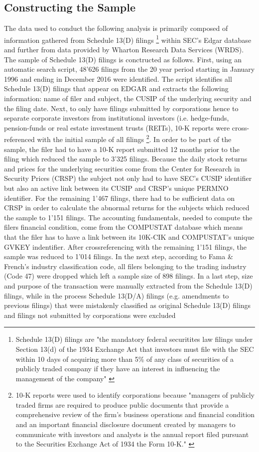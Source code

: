 \documentclass[12pt]{article}
\begin{document}
\subsection{Constructing the Sample}
The data used to conduct the following analysis is primarily composed of information gathered from Schedule 13(D) filings 
	\footnote{Schedule 13(D) filings are "the mandatory federal securitites law filings under Section 13(d) of the 1934 Exchange Act that investors must file with the SEC within 10 days of acquiring more than 5\% of any class of securities of a publicly traded company if they have an interest in influencing the management of the company" \citep[p. 1736]{Brav2008}} 
within SEC's Edgar database and further from data provided by Wharton Research Data Services (WRDS). The sample of Schedule 13(D) filings is conctructed as follows. First, using an automatic search script, 48'626 filings from the 20 year period starting in January 1996 and ending in December 2016 were identified.  The script identifies all Schedule 13(D) filings that appear on EDGAR and extracts the following information: name of filer and subject, the CUSIP of the underlying security and the filing date. Next, to only have filings submitted by corporations hence to separate corporate investors from institutional investors (i.e. hedge-funds, pension-funds or real estate investment trusts (REITs), 10-K reports were cross-referenced with the initial sample of all filings
	\footnote{10-K reports were used to identify corporations because "managers of publicly traded firms are required to produce public documents that provide a comprehensive review of the firm’s business operations and financial condition and an important financial disclosure document created by managers to communicate with investors and analysts is the annual report filed pursuant to the Securities Exchange Act of 1934 the Form 10-K." \citep[p. 1643]{Loughran2014}}. 
In order to be part of the sample, the filer had to have a 10-K report submitted 12 months prior to the filing which reduced the sample to 3'325 filings. Because the daily stock returns and prices for the underlying securities come from the Center for Research in Security Prices (CRSP) the subject not only had to have SEC's CUSIP identifier but also an active link between its CUSIP and CRSP's unique PERMNO identifier. For the remaining 1'467 filings, there had to be sufficient data on CRSP in order to calculate the abnormal returns for the subjects which reduced the sample to 1'151 filings. 
The accounting fundamentals, needed to compute the filers financial condition, come from the COMPUSTAT database which means that the filer has to have a link between its 10K-CIK and COMPUSTAT's unique GVKEY indentifier. After crossreferencing with the remaining 1'151 filings, the sample was reduced to 1'014 filings. In the next step, according to Fama \& French's industry classification code, all filers belonging to the trading industry (Code 47) were dropped which left a sample size of 898 filings. In a last step, size and purpose of the transaction were manually extracted from the Schedule 13(D) filings, while in the process Schedule 13(D/A) filings (e.g. amendments to previous filings) that were mistakenly classified as original Schedule 13(D) filings and filings not submitted by corporations were excluded 
\end{document}
